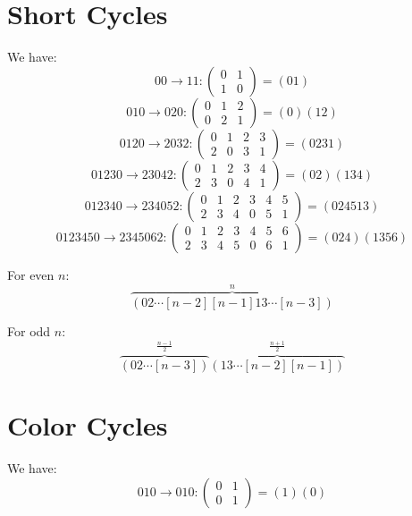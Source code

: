 \documentclass[a4paper,10pt]{article}
\begin{document}
\section{Short Cycles}
We have:
\begin{equation}
00\rightarrow11:
\begin{pmatrix}
0&1\\
1&0
\end{pmatrix} = (01)
\end{equation}
\begin{equation}
010\rightarrow020:
\begin{pmatrix}
0&1&2\\
0&2&1
\end{pmatrix} = (0)(12)
\end{equation}
\begin{equation}
0120\rightarrow2032:
\begin{pmatrix}
0&1&2&3\\
2&0&3&1
\end{pmatrix} = (0231)
\end{equation}
\begin{equation}
01230\rightarrow23042:
\begin{pmatrix}
0&1&2&3&4\\
2&3&0&4&1
\end{pmatrix} = (02)(134)
\end{equation}
\begin{equation}
012340\rightarrow234052:
\begin{pmatrix}
0&1&2&3&4&5\\
2&3&4&0&5&1
\end{pmatrix} = (024513)
\end{equation}
\begin{equation}
0123450\rightarrow2345062:
\begin{pmatrix}
0&1&2&3&4&5&6\\
2&3&4&5&0&6&1
\end{pmatrix} = (024)(1356)
\end{equation}

For even $n$:
\begin{equation}
\overbrace{(02\cdots[n-2][n-1]13\cdots[n-3])}^{n}
\end{equation}

For odd $n$:
\begin{equation}
\overbrace{(02\cdots[n-3])}^{\frac{n-1}{2}}\overbrace{(13\cdots[n-2][n-1])}^{\frac{n+1}{2}} 
\end{equation}

\section{Color Cycles}
We have:
\begin{equation}
010\rightarrow010:
\begin{pmatrix}
0&1\\
0&1
\end{pmatrix} = (1)(0)
\end{equation}
\end{document}
